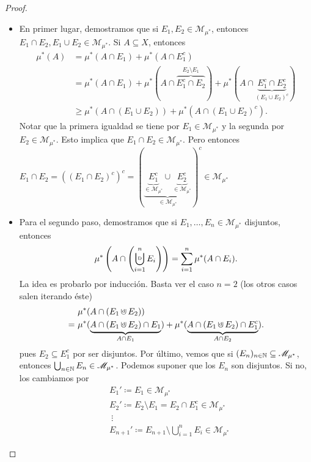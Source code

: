\begin{proof}
\begin{enumerate}
		\begin{itemize}
		\item En primer lugar, demostramos que si $E_1,E_2 \in \mathscr{M}_{\mu^{*}}$, entonces $E_1 \cap E_2, E_1 \cup E_2 \in \mathscr{M}_{\mu^{*}}$. Si $A \subseteq X$, entonces
			\begin{align*}
				\mu^{*}(A) & = \mu^{*}(A \cap E_1) + \mu^{*}(A \cap E_1^c) \\
				& = \mu^{*}(A \cap E_1) + \mu^{*}(A \cap \overbrace{E_1^c \cap E_2}^{E_2 \setminus E_1}) + \mu^{*}(A \cap \underbrace{E_1^c \cap E_2^c}_{(E_1 \cup E_2)^c}) \\
				& \geq \mu^{*}(A \cap (E_1 \cup E_2)) + \mu^{*}(A \cap (E_1 \cup E_2)^c) 
			.\end{align*}
			Notar que la primera igualdad se tiene por $E_1 \in \mathscr{M}_{\mu^{*}}$ y la segunda por $E_2 \in \mathscr{M}_{\mu^{*}}$. Esto implica que $E_1 \cap E_2 \in \mathscr{M}_{\mu^{*}}$. Pero entonces $E_1 \cap E_2 = ((E_1 \cap E_2)^c)^c = (\underbrace{\underbrace{E_{1}^c}_{\in \mathscr{M}_{\mu^{*}}} \cup \underbrace{E_{2}^c}_{\in \mathscr{M}_{\mu^{*}}}}_{\in \mathscr{M}_{\mu^{*}}})^c \in \mathscr{M}_{\mu^{*}}$
		\item Para el segundo paso, demostramos que si $E_1,\dots,E_n \in \mathscr{M}_{\mu^{*}}$ disjuntos, entonces 
		\[ \mu^{*}\left(A \cap \left(\displaystyle\bigcupd_{i=1}^{n} E_i \right)\right) = \displaystyle\sum_{i=1}^{n} \mu^{*}(A \cap E_i). \]
			La idea es probarlo por inducción. Basta ver el caso $n=2$ (los otros casos salen iterando éste)
			\begin{align*}
				& \mu^{*}(A \cap (E_1 \cupd E_2)) \\
				= \ & \mu^{*}(\underbrace{A \cap (E_1 \cupd E_2) \cap E_1}_{A \cap E_1}) + \mu^{*}(\underbrace{A \cap (E_1 \cupd E_2) \cap E_1^c}_{A \cap E_2}) 
			.\end{align*}
			pues $E_2 \subseteq E_1^c$ por ser disjuntos.
		Por último, vemos que si $(E_n)_{n\in\mathbb{N}} \subseteq \mathscr{M}_{\mu^{*}}$, entonces $\bigcup_{n\in\mathbb{N}} E_n \in \mathscr{M}_{\mu^{*}}$.
			Podemos suponer que los $E_n$ son disjuntos. Si no, los cambiamos por
			\begin{align*}
				& E_{1}' \coloneq E_{1} \in \mathscr{M}_{\mu^{*}} \\
				& E_{2}' \coloneq E_{2} \setminus E_{1} = E_2 \cap E_1^c \in \mathscr{M}_{\mu^{*}} \\
				& \ \vdots \\
				& E_{n+1}' \coloneq E_{n+1} \setminus \bigcup_{i=1}^{n} E_i \in \mathscr{M}_{\mu^{*}}

\end{align*}
\end{itemize}
\end{enumerate}
\end{proof}
